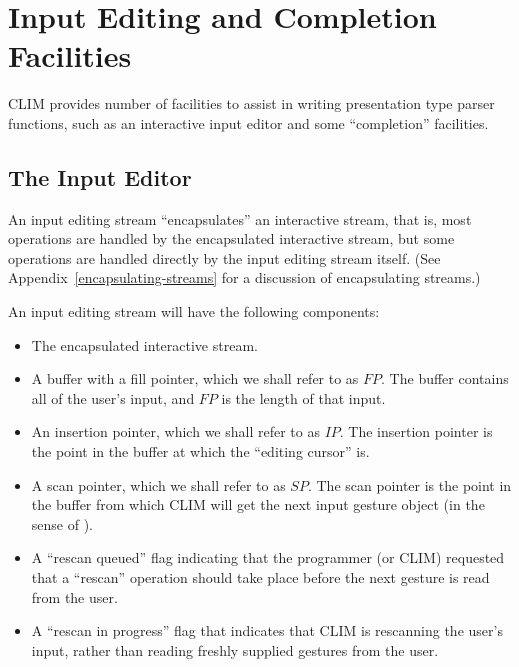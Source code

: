 
\chapter {Input Editing and Completion Facilities}
\label {input-editing}

CLIM provides number of facilities to assist in writing presentation type parser
functions, such as an interactive input editor and some ``completion''
facilities.


\section {The Input Editor}

An input editing stream ``encapsulates'' an interactive stream, that is, most
operations are handled by the encapsulated interactive stream, but some
operations are handled directly by the input editing stream itself.  (See
Appendix~\ref{encapsulating-streams} for a discussion of encapsulating streams.)

An input editing stream will have the following components:

\begin{itemize}
\item The encapsulated interactive stream.

\item A buffer with a fill pointer, which we shall refer to as $FP$.  The buffer
contains all of the user's input, and $FP$ is the length of that input.

\item An insertion pointer, which we shall refer to as $IP$.  The insertion
pointer is the point in the buffer at which the ``editing cursor'' is.

\item A scan pointer, which we shall refer to as $SP$.  The scan pointer is the
point in the buffer from which CLIM will get the next input gesture object (in
the sense of ).

\item A ``rescan queued'' flag indicating that the programmer (or CLIM)
requested that a ``rescan'' operation should take place before the next gesture
is read from the user.

\item A ``rescan in progress'' flag that indicates that CLIM is rescanning the
user's input, rather than reading freshly supplied gestures from the user.
\end{itemize}

